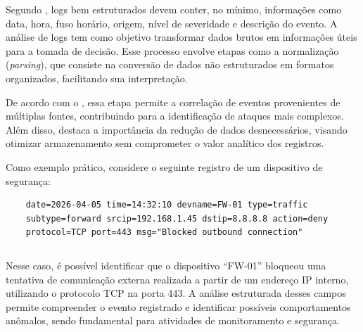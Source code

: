 \documentclass[
    12pt
    ,oneside
    ,a4paper
    ,chapter=TITLE
    ,section=TITLE
    ,sumario=abnt-6027-2012]{abntex2}
\begin{document}
Segundo , logs bem estruturados devem conter, no mínimo, informações como data, hora, fuso horário, origem, nível de severidade e descrição do evento. A análise de logs tem como objetivo transformar dados brutos em informações úteis para a tomada de decisão. Esse processo envolve etapas como a normalização (\textit{parsing}), que consiste na conversão de dados não estruturados em formatos organizados, facilitando sua interpretação.

De acordo com o , essa etapa permite a correlação de eventos provenientes de múltiplas fontes, contribuindo para a identificação de ataques mais complexos. Além disso,  destaca a importância da redução de dados desnecessários, visando otimizar armazenamento sem comprometer o valor analítico dos registros.

Como exemplo prático, considere o seguinte registro de um dispositivo de segurança:


\begin{codigo}[htb]
\begin{lstlisting}
    date=2026-04-05 time=14:32:10 devname=FW-01 type=traffic 
    subtype=forward srcip=192.168.1.45 dstip=8.8.8.8 action=deny 
    protocol=TCP port=443 msg="Blocked outbound connection"
\end{lstlisting}
\fonteautor
\end{codigo}

\begin{verbatim}
\end{verbatim}

Nesse caso, é possível identificar que o dispositivo ``FW-01'' bloqueou uma tentativa de comunicação externa realizada a partir de um endereço IP interno, utilizando o protocolo TCP na porta 443. A análise estruturada desses campos permite compreender o evento registrado e identificar possíveis comportamentos anômalos, sendo fundamental para atividades de monitoramento e segurança.


\end{document}
